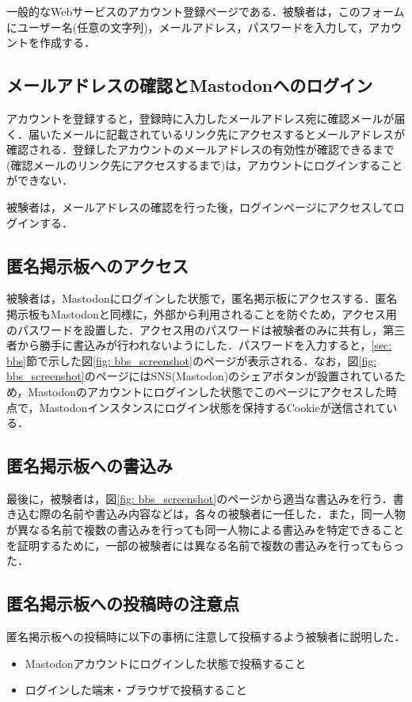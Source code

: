 \documentclass[10pt, a4paper]{jreport}
\begin{document}
一般的なWebサービスのアカウント登録ページである．被験者は，このフォームにユーザー名(任意の文字列)，メールアドレス，パスワードを入力して，アカウントを作成する．

\subsection{メールアドレスの確認とMastodonへのログイン}
アカウントを登録すると，登録時に入力したメールアドレス宛に確認メールが届く．届いたメールに記載されているリンク先にアクセスするとメールアドレスが確認される．登録したアカウントのメールアドレスの有効性が確認できるまで(確認メールのリンク先にアクセスするまで)は，アカウントにログインすることができない．

被験者は，メールアドレスの確認を行った後，ログインページにアクセスしてログインする．

\subsection{匿名掲示板へのアクセス}
被験者は，Mastodonにログインした状態で，匿名掲示板にアクセスする．匿名掲示板もMastodonと同様に，外部から利用されることを防ぐため，アクセス用のパスワードを設置した．アクセス用のパスワードは被験者のみに共有し，第三者から勝手に書込みが行われないようにした．パスワードを入力すると，\ref{sec: bbs}節で示した図\ref{fig: bbs_screenshot}のページが表示される．なお，図\ref{fig: bbs_screenshot}のページにはSNS(Mastodon)のシェアボタンが設置されているため，Mastodonのアカウントにログインした状態でこのページにアクセスした時点で，Mastodonインスタンスにログイン状態を保持するCookieが送信されている．

\subsection{匿名掲示板への書込み}
最後に，被験者は，図\ref{fig: bbs_screenshot}のページから適当な書込みを行う．書き込む際の名前や書込み内容などは，各々の被験者に一任した．また，同一人物が異なる名前で複数の書込みを行っても同一人物による書込みを特定できることを証明するために，一部の被験者には異なる名前で複数の書込みを行ってもらった．

\subsection{匿名掲示板への投稿時の注意点}
匿名掲示板への投稿時に以下の事柄に注意して投稿するよう被験者に説明した．

\begin{itemize}
\item{Mastodonアカウントにログインした状態で投稿すること}
\item{ログインした端末・ブラウザで投稿すること}
\end{itemize}
\end{document}
